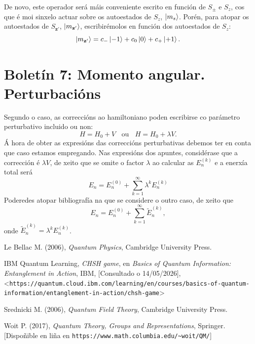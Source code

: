 \documentclass[a4paper,12pt]{article}
\begin{document}
De novo, este operador será máis conveniente escrito en función de $S_\pm$ e $S_z$, cos que é moi sinxelo actuar sobre os autoestados de $S_z$, $\ket{m_s}$. Porén, para atopar os autoestados de $S_{\textbf{z}'}$, $\ket{m_{\textbf{z}'}}$, escribirémolos en función dos autoestados de $S_z$:
\begin{equation}
	\ket{m_{\textbf{z}'}} = c_- \ket{-1} + c_0 \ket{0} + c_+ \ket{+1}.
\end{equation}

\newpage
\section*{Boletín 7: Momento angular. Perturbacións}

Segundo o caso, as correccións ao hamiltoniano poden escribirse co parámetro perturbativo incluido ou non:
\begin{equation}
	H = H_0 + V ~~~~\text{ou}~~~~ H = H_0 + \lambda V.
\end{equation}
\noindent
Á hora de obter as expresións das correccións perturbativas debemos ter en conta que caso estamos empregando. Nas expresións dos apuntes, considérase que a corrección é $\lambda V$, de xeito que se omite o factor $\lambda$ ao calcular as $E^{(k)}_n$ e a enerxía total será
\begin{equation}
	E_n = E^{(0)}_n + \sum_{k=1}^\infty \lambda^k E^{(k)}_n
\end{equation}
Poderedes atopar bibliografía na que se considere o outro caso, de xeito que
\begin{equation}
	E_n = E^{(0)}_n + \sum_{k=1}^\infty  \tilde{E}^{(k)}_n,
\end{equation}
\noindent
onde $\tilde{E}^{(k)}_n = \lambda^k E^{(k)}_{n}$.

\newpage
\begin{thebibliography}{}
	 Le Bellac M. (2006), \textit{Quantum Physics}, Cambridge University Press.

	 IBM Quantum Learning, \textit{CHSH game}, en \textit{Basics of Quantum Information: Entanglement in Action}, IBM, [Consultado o 14/05/2026], <\verb+https://quantum.cloud.ibm.com/learning/en/courses/basics-of-quantum-information/entanglement-in-action/chsh-game+>

	 Srednicki M. (2006), \textit{Quantum Field Theory}, Cambridge University Press.

	 Woit P. (2017), \textit{Quantum Theory, Groups and Representations}, Springer. [Dispoñible en liña en \verb+https://www.math.columbia.edu/~woit/QM/+]
\end{thebibliography}
\end{document}
